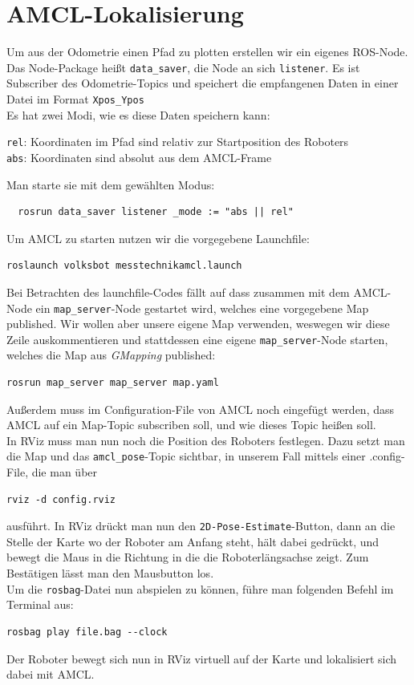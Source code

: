 \documentclass[11pt,a4paper]{article}
\begin{document}
\section{AMCL-Lokalisierung}
Um aus der Odometrie einen Pfad zu plotten erstellen wir ein eigenes ROS-Node. Das Node-Package heißt \verb|data_saver|, 
die Node an sich \texttt{listener}. Es ist Subscriber des Odometrie-Topics und speichert die empfangenen Daten 
in einer Datei im Format \verb|Xpos_Ypos| \\
Es hat zwei Modi, wie es diese Daten speichern kann:
\begin{center}
\texttt{rel}: Koordinaten im Pfad sind relativ zur Startposition des Roboters \\
\texttt{abs}: Koordinaten sind absolut aus dem AMCL-Frame \\
\end{center}
Man starte sie mit dem gewählten Modus:
\begin{verbatim}
  rosrun data_saver listener _mode := "abs || rel"
\end{verbatim}
Um AMCL zu starten nutzen wir die vorgegebene Launchfile:
\begin{verbatim}
roslaunch volksbot messtechnikamcl.launch
\end{verbatim}
Bei Betrachten des launchfile-Codes fällt auf dass zusammen mit dem AMCL-Node ein \verb|map_server|-Node gestartet
wird, welches eine vorgegebene Map published. Wir wollen aber unsere eigene Map verwenden, weswegen wir diese Zeile
auskommentieren und stattdessen eine eigene \verb|map_server|-Node starten, welches die Map aus \textit{GMapping}
published: \begin{verbatim}
rosrun map_server map_server map.yaml
\end{verbatim}
Außerdem muss im Configuration-File von AMCL noch eingefügt werden, dass AMCL auf ein Map-Topic subscriben soll,
und wie dieses Topic heißen soll. \\
In RViz muss man nun noch die Position des Roboters festlegen. Dazu setzt man die Map und das \verb|amcl_pose|-Topic
sichtbar, in unserem Fall mittels einer .config-File, die man über \begin{verbatim}
rviz -d config.rviz
\end{verbatim}
ausführt.
In RViz drückt man nun den \verb|2D-Pose-Estimate|-Button, dann an die Stelle der Karte wo der Roboter am Anfang steht,
hält dabei gedrückt, und bewegt die Maus in die Richtung in die die Roboterlängsachse zeigt. Zum Bestätigen
lässt man den Mausbutton los. \\
Um die \texttt{rosbag}-Datei nun abspielen zu können, führe man folgenden Befehl im Terminal aus:
\begin{verbatim}
rosbag play file.bag --clock
\end{verbatim}
Der Roboter bewegt sich nun in RViz virtuell auf der Karte und lokalisiert sich dabei mit AMCL.
\end{document}

